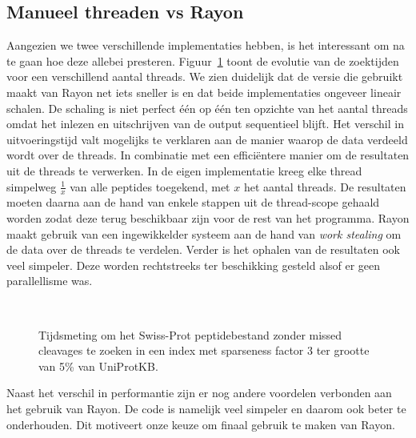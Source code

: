 \subsection{Manueel threaden vs Rayon}\label{subsec:manueel-threaden-vs-rayon}
Aangezien we twee verschillende implementaties hebben, is het interessant om na te gaan hoe deze allebei presteren.
Figuur~\ref{fig:threading_default_vs_rayon} toont de evolutie van de zoektijden voor een verschillend aantal threads.
We zien duidelijk dat de versie die gebruikt maakt van Rayon net iets sneller is en dat beide implementaties ongeveer lineair schalen.
De schaling is niet perfect één op één ten opzichte van het aantal threads omdat het inlezen en uitschrijven van de output sequentieel blijft.
Het verschil in uitvoeringstijd valt mogelijks te verklaren aan de manier waarop de data verdeeld wordt over de threads.
In combinatie met een efficiëntere manier om de resultaten uit de threads te verwerken.
In de eigen implementatie kreeg elke thread simpelweg $\frac{1}{x}$ van alle peptides toegekend, met $x$ het aantal threads.
De resultaten moeten daarna aan de hand van enkele stappen uit de thread-scope gehaald worden zodat deze terug beschikbaar zijn voor de rest van het programma.
Rayon maakt gebruik van een ingewikkelder systeem aan de hand van \textit{work stealing}\cite{rayon_stealing} om de data over de threads te verdelen.
Verder is het ophalen van de resultaten ook veel simpeler.
Deze worden rechtstreeks ter beschikking gesteld alsof er geen parallellisme was.

\begin{figure}[H]
    \centering
    \\[4ex] %

    \caption{Tijdsmeting om het Swiss-Prot peptidebestand zonder missed cleavages te zoeken in een index met sparseness factor 3 ter grootte van 5\% van UniProtKB.}\label{fig:threading_default_vs_rayon}
\end{figure}

Naast het verschil in performantie zijn er nog andere voordelen verbonden aan het gebruik van Rayon.
De code is namelijk veel simpeler en daarom ook beter te onderhouden.
Dit motiveert onze keuze om finaal gebruik te maken van Rayon.

